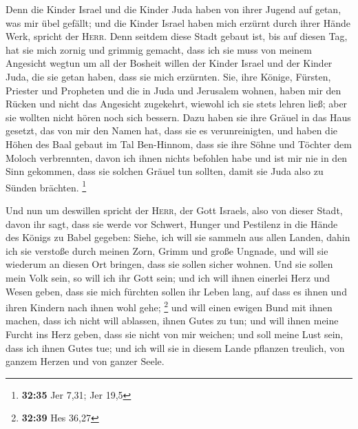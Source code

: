  Denn die Kinder Israel und die Kinder Juda haben von
ihrer Jugend auf getan, was mir übel gefällt; und die Kinder Israel
haben mich erzürnt durch ihrer Hände Werk, spricht der \textsc{Herr}.
 Denn seitdem diese Stadt gebaut ist, bis auf diesen Tag,
hat sie mich zornig und grimmig gemacht, dass ich sie muss von meinem
Angesicht wegtun  um all der Bosheit willen der Kinder
Israel und der Kinder Juda, die sie getan haben, dass sie mich
erzürnten. Sie, ihre Könige, Fürsten, Priester und Propheten und die in
Juda und Jerusalem wohnen,  haben mir den Rücken und
nicht das Angesicht zugekehrt, wiewohl ich sie stets lehren ließ; aber
sie wollten nicht hören noch sich bessern.  Dazu haben
sie ihre Gräuel in das Haus gesetzt, das von mir den Namen hat, dass sie
es verunreinigten,  und haben die Höhen des Baal gebaut
im Tal Ben-Hinnom, dass sie ihre Söhne und Töchter dem Moloch
verbrennten, davon ich ihnen nichts befohlen habe und ist mir nie in den
Sinn gekommen, dass sie solchen Gräuel tun sollten, damit sie Juda also
zu Sünden brächten. \footnote{\textbf{32:35} Jer 7,31; Jer 19,5}

 Und nun um deswillen spricht der \textsc{Herr}, der Gott
Israels, also von dieser Stadt, davon ihr sagt, dass sie werde vor
Schwert, Hunger und Pestilenz in die Hände des Königs zu Babel gegeben:
 Siehe, ich will sie sammeln aus allen Landen, dahin ich
sie verstoße durch meinen Zorn, Grimm und große Ungnade, und will sie
wiederum an diesen Ort bringen, dass sie sollen sicher wohnen.
 Und sie sollen mein Volk sein, so will ich ihr Gott
sein;  und ich will ihnen einerlei Herz und Wesen geben,
dass sie mich fürchten sollen ihr Leben lang, auf dass es ihnen und
ihren Kindern nach ihnen wohl gehe; \footnote{\textbf{32:39} Hes 36,27}
 und will einen ewigen Bund mit ihnen machen, dass ich
nicht will ablassen, ihnen Gutes zu tun; und will ihnen meine Furcht ins
Herz geben, dass sie nicht von mir weichen;  und soll
meine Lust sein, dass ich ihnen Gutes tue; und ich will sie in diesem
Lande pflanzen treulich, von ganzem Herzen und von ganzer Seele.

